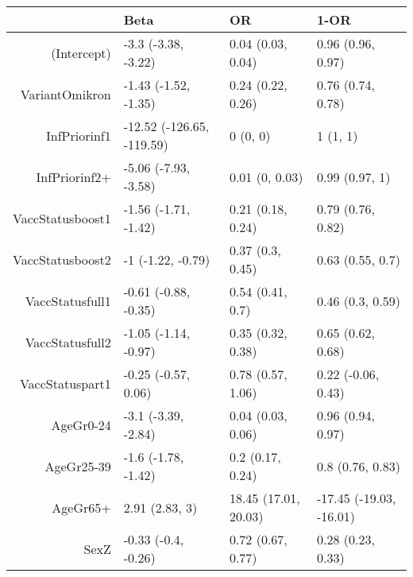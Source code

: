 \begin{table}[ht]
\centering
\begin{tabular}{rlll}
  \hline
 & Beta & OR & 1-OR \\ 
  \hline
(Intercept) & -3.3 (-3.38, -3.22) & 0.04 (0.03, 0.04) & 0.96 (0.96, 0.97) \\ 
  VariantOmikron & -1.43 (-1.52, -1.35) & 0.24 (0.22, 0.26) & 0.76 (0.74, 0.78) \\ 
  InfPriorinf1 & -12.52 (-126.65, -119.59) & 0 (0, 0) & 1 (1, 1) \\ 
  InfPriorinf2+ & -5.06 (-7.93, -3.58) & 0.01 (0, 0.03) & 0.99 (0.97, 1) \\ 
  VaccStatusboost1 & -1.56 (-1.71, -1.42) & 0.21 (0.18, 0.24) & 0.79 (0.76, 0.82) \\ 
  VaccStatusboost2 & -1 (-1.22, -0.79) & 0.37 (0.3, 0.45) & 0.63 (0.55, 0.7) \\ 
  VaccStatusfull1 & -0.61 (-0.88, -0.35) & 0.54 (0.41, 0.7) & 0.46 (0.3, 0.59) \\ 
  VaccStatusfull2 & -1.05 (-1.14, -0.97) & 0.35 (0.32, 0.38) & 0.65 (0.62, 0.68) \\ 
  VaccStatuspart1 & -0.25 (-0.57, 0.06) & 0.78 (0.57, 1.06) & 0.22 (-0.06, 0.43) \\ 
  AgeGr0-24 & -3.1 (-3.39, -2.84) & 0.04 (0.03, 0.06) & 0.96 (0.94, 0.97) \\ 
  AgeGr25-39 & -1.6 (-1.78, -1.42) & 0.2 (0.17, 0.24) & 0.8 (0.76, 0.83) \\ 
  AgeGr65+ & 2.91 (2.83, 3) & 18.45 (17.01, 20.03) & -17.45 (-19.03, -16.01) \\ 
  SexZ & -0.33 (-0.4, -0.26) & 0.72 (0.67, 0.77) & 0.28 (0.23, 0.33) \\ 
   \hline
\end{tabular}
\end{table}
